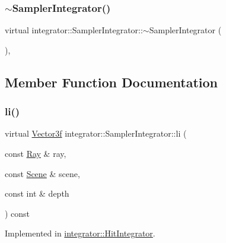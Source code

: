 \subsubsection{\texorpdfstring{$\sim$SamplerIntegrator()}{~SamplerIntegrator()}}
{\footnotesize\ttfamily virtual integrator\+::\+Sampler\+Integrator\+::$\sim$\+Sampler\+Integrator (\begin{DoxyParamCaption}{ }\end{DoxyParamCaption})\hspace{0.3cm}{\ttfamily [inline]}, {\ttfamily [virtual]}}



\subsection{Member Function Documentation}
\mbox{\label{classintegrator_1_1SamplerIntegrator_ae08842b8b93175f1ee23a93733161181}} 
\subsubsection{\texorpdfstring{li()}{li()}}
{\footnotesize\ttfamily virtual \mbox{\hyperlink{cyclop_8hpp_a5a0a2e85b081623ef3f7e7e8d43024f5}{Vector3f}} integrator\+::\+Sampler\+Integrator\+::li (\begin{DoxyParamCaption}\item[{const \mbox{\hyperlink{classRay}{Ray}} \&}]{ray,  }\item[{const \mbox{\hyperlink{classScene}{Scene}} \&}]{scene,  }\item[{const int \&}]{depth }\end{DoxyParamCaption}) const\hspace{0.3cm}{\ttfamily [pure virtual]}}



Implemented in \mbox{\hyperlink{classintegrator_1_1HitIntegrator_ad496bec99d8dbb65eeb0b32787f087dc}{integrator\+::\+Hit\+Integrator}}.

\mbox{\label{classintegrator_1_1SamplerIntegrator_af02630880edd63090b71e414b25e895f}} 
